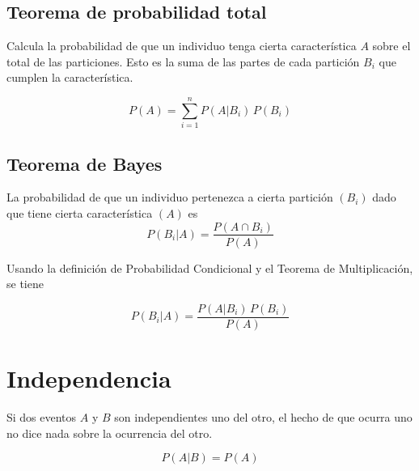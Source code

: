 \subsection{Teorema de probabilidad total}

Calcula la probabilidad de que un individuo tenga cierta característica $A$ sobre el total de las particiones.
Esto es la suma de las partes de cada partición $B_i$ que cumplen la característica.

\begin{mdframed}[style=PropertyFrame]
    \begin{prop}
    \end{prop}
    \begin{equation*}
        P(A) = \sum_{i=1}^n P(A|B_i) \, P(B_i)
    \end{equation*}
\end{mdframed}


\subsection{Teorema de Bayes}

La probabilidad de que un individuo pertenezca a cierta partición $(B_i)$ dado que tiene cierta característica $(A)$ es
\begin{equation*}
    P(B_i|A) = \frac{P(A \cap B_i)}{P(A)}
\end{equation*}

Usando la definición de Probabilidad Condicional y el Teorema de Multiplicación, se tiene

\begin{mdframed}[style=PropertyFrame]
    \begin{prop}
    \end{prop}
    \begin{equation*}
        P(B_i|A) = \frac{P(A|B_i) \, P(B_i)}{P(A)}
    \end{equation*}
\end{mdframed}


\section{Independencia}

Si dos eventos $A$ y $B$ son independientes uno del otro, el hecho de que ocurra uno no dice nada sobre la ocurrencia del otro.

\begin{mdframed}[style=DefinitionFrame]
    \begin{defn}
    \end{defn}
    \begin{equation*}
        P(A|B) = P(A)
    \end{equation*}
\end{mdframed}

